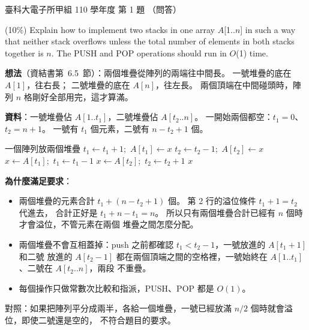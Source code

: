 \begin{pastexam}[label={px:ntust-110-ete-ds-01}]{臺科大電子所甲組 110 學年度 第 1 題}
（問答）

(10\%) Explain how to implement two stacks in one array $A$[1..$n$] in such a way that neither
stack overflows unless the total number of elements in both stacks together is $n$. The PUSH and
POP operations should run in $O$(1) time.
\end{pastexam}

\begin{pastsoln}
\textbf{想法}（資結書第~6.5~節）：兩個堆疊從陣列的兩端往中間長。 一號堆疊的底在 $A[1]$，往右長；
二號堆疊的底在 $A[n]$，往左長。 兩個頂端在中間碰頭時，陣列 $n$ 格剛好全部用完，這才算滿。

\textbf{資料}：一號堆疊佔 $A[1..t_1]$，二號堆疊佔 $A[t_2..n]$。 一開始兩個都空：$t_1 = 0$、
$t_2 = n + 1$。 一號有 $t_1$ 個元素，二號有 $n - t_2 + 1$ 個。

\begin{pseudo}{一個陣列放兩個堆疊}
 
        \State {} 
    \EndIf
        \State $t_1 \gets t_1 + 1$;\ $A[t_1] \gets x$
    \Else
        \State $t_2 \gets t_2 - 1$;\ $A[t_2] \gets x$
    \EndIf
\EndProcedure
{}
          \EndIf
        \State $x \gets A[t_1]$;\ $t_1 \gets t_1 - 1$
    \Else
          \EndIf
        \State $x \gets A[t_2]$;\ $t_2 \gets t_2 + 1$
    \EndIf
    \State \Return $x$
\EndFunction
\end{pseudo}

\textbf{為什麼滿足要求}：
\begin{itemize}
\item 兩個堆疊的元素合計 $t_1 + (n - t_2 + 1)$ 個。 第 2 行的溢位條件 $t_1 + 1 = t_2$ 代進去，
合計正好是 $t_1 + n - t_1 = n$。 所以只有兩個堆疊合計已經有 $n$ 個時才會溢位，不管元素在兩個
堆疊之間怎麼分配。
\item 兩個堆疊不會互相蓋掉：push 之前都確認 $t_1 < t_2 - 1$，一號放進的 $A[t_1 + 1]$ 和二號
放進的 $A[t_2 - 1]$ 都在兩個頂端之間的空格裡，一號始終在 $A[1..t_1]$、二號在 $A[t_2..n]$，兩段
不重疊。
\item 每個操作只做常數次比較和指派，PUSH、POP 都是 $O(1)$。
\end{itemize}
對照：如果把陣列平分成兩半，各給一個堆疊，一號已經放滿 $n/2$ 個時就會溢位，即使二號還是空的，
不符合題目的要求。
\end{pastsoln}
